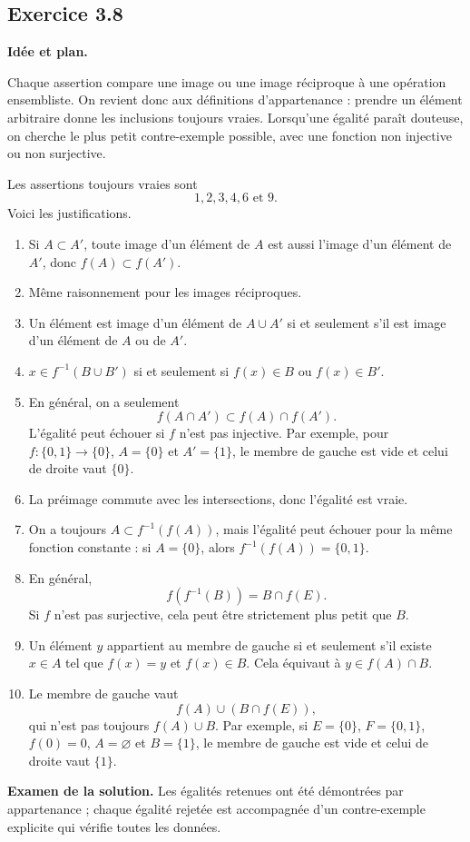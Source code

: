 \documentclass[11pt,a4paper]{article}
\newcommand{\1}{\mathbf 1}
\newenvironment{corrige}[1]{%
  \Needspace{5\baselineskip}%
  \subsection*{Exercice #1}%
  \addcontentsline{toc}{subsection}{Exercice #1}%
}{\medskip}
\newenvironment{methode}{%
  \begin{center}\begin{minipage}{0.94\linewidth}
  \color{MATblue}\textbf{Idée et plan.}\enspace
}{%
  \end{minipage}\end{center}
}
\begin{document}
\begin{corrige}{3.8}
\begin{methode}
Chaque assertion compare une image ou une image réciproque à une opération ensembliste. On revient donc aux définitions d'appartenance : prendre un élément arbitraire donne les inclusions toujours vraies. Lorsqu'une égalité paraît douteuse, on cherche le plus petit contre-exemple possible, avec une fonction non injective ou non surjective.
\end{methode}
Les assertions toujours vraies sont
\[
\boxed{1,2,3,4,6\text{ et }9}.
\]
Voici les justifications.
\begin{enumerate}
  \item Si $A\subset A'$, toute image d'un élément de $A$ est aussi l'image d'un élément de $A'$, donc $f(A)\subset f(A')$.
  \item Même raisonnement pour les images réciproques.
  \item Un élément est image d'un élément de $A\cup A'$ si et seulement s'il est image d'un élément de $A$ ou de $A'$.
  \item $x\in f^{-1}(B\cup B')$ si et seulement si $f(x)\in B$ ou $f(x)\in B'$.
  \item En général, on a seulement
  \[
  f(A\cap A')\subset f(A)\cap f(A').
  \]
  L'égalité peut échouer si $f$ n'est pas injective. Par exemple, pour $f:\{0,1\}\to\{0\}$, $A=\{0\}$ et $A'=\{1\}$, le membre de gauche est vide et celui de droite vaut $\{0\}$.
  \item La préimage commute avec les intersections, donc l'égalité est vraie.
  \item On a toujours $A\subset f^{-1}(f(A))$, mais l'égalité peut échouer pour la même fonction constante : si $A=\{0\}$, alors $f^{-1}(f(A))=\{0,1\}$.
  \item En général,
  \[
  f(f^{-1}(B))=B\cap f(E).
  \]
  Si $f$ n'est pas surjective, cela peut être strictement plus petit que $B$.
  \item Un élément $y$ appartient au membre de gauche si et seulement s'il existe $x\in A$ tel que $f(x)=y$ et $f(x)\in B$. Cela équivaut à $y\in f(A)\cap B$.
  \item Le membre de gauche vaut
  \[
  f(A)\cup(B\cap f(E)),
  \]
  qui n'est pas toujours $f(A)\cup B$. Par exemple, si $E=\{0\}$, $F=\{0,1\}$, $f(0)=0$, $A=\varnothing$ et $B=\{1\}$, le membre de gauche est vide et celui de droite vaut $\{1\}$.
\end{enumerate}
\textbf{Examen de la solution.} Les égalités retenues ont été démontrées par appartenance ; chaque égalité rejetée est accompagnée d'un contre-exemple explicite qui vérifie toutes les données.
\end{corrige}
\end{document}

